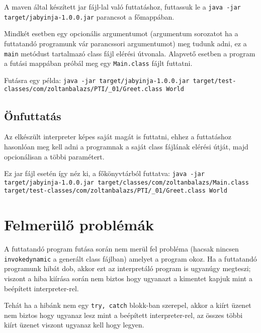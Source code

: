 A maven által készített jar fájl-lal való futtatáshoz, futtassuk le a \lstinline{java -jar target/jabyinja-1.0.0.jar} parancsot a főmappában.

Mindkét esetben egy opcionális argumentumot (argumentum sorozatot ha a futtatandó programunk vár parancssori argumentumot) meg tudunk adni, ez a \lstinline{main} metódust tartalmazó class fájl elérési útvonala. Alapvető esetben a program a futási mappában próbál meg egy \lstinline{Main.class} fájlt futtatni.

Futásra egy példa:
\lstinline{java -jar target/jabyinja-1.0.0.jar target/test-classes/com/zoltanbalazs/PTI/_01/Greet.class World}

\subsection{Önfuttatás}

Az elkészült interpreter képes saját magát is futtatni, ehhez a futtatáshoz hasonlóan meg kell adni a programnak a saját class fájlának elérési útját, majd opcionálisan a többi paramétert.

Ez jar fájl esetén így néz ki, a főkönyvtárból futtatva:
\lstinline{java -jar target/jabyinja-1.0.0.jar target/classes/com/zoltanbalazs/Main.class target/test-classes/com/zoltanbalazs/PTI/_01/Greet.class World}

\section{Felmerülő problémák}

A futtatandó program futása során nem merül fel probléma (hacsak nincsen \lstinline{invokedynamic} a generált class fájlban) amelyet a program okoz. Ha a futtatandó programunk hibát dob, akkor ezt az interpretáló program is ugyanúgy megteszi; viszont a hiba kiírása során nem biztos hogy ugyanazt a kimentet kapjuk mint a beépített interpreter-rel.

Tehát ha a hibánk nem egy \lstinline{try, catch} blokk-ban szerepel, akkor a kiírt üzenet nem biztos hogy ugyanaz lesz mint a beépített interpreter-rel, az összes többi kiírt üzenet viszont ugyanaz kell hogy legyen.